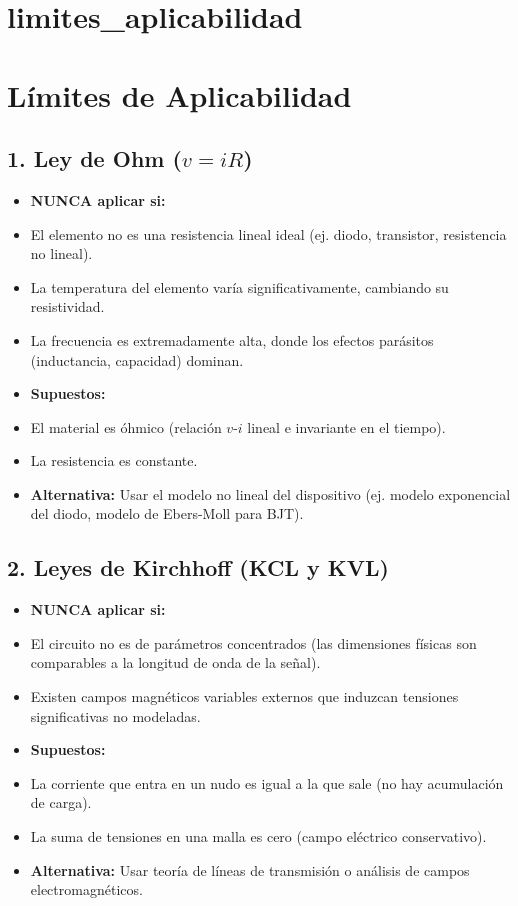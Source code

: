 \documentclass[11pt,a4paper]{article}
\begin{document}
\section*{limites\_aplicabilidad}

\section*{Límites de Aplicabilidad}


\subsection*{1. Ley de Ohm ($v = iR$)}


\begin{itemize}[leftmargin=*,topsep=2pt,itemsep=1pt]
  \item \textbf{NUNCA aplicar si:}
  \item El elemento no es una resistencia lineal ideal (ej. diodo, transistor, resistencia no lineal).
  \item La temperatura del elemento varía significativamente, cambiando su resistividad.
  \item La frecuencia es extremadamente alta, donde los efectos parásitos (inductancia, capacidad) dominan.
  \item \textbf{Supuestos:}
  \item El material es óhmico (relación $v$-$i$ lineal e invariante en el tiempo).
  \item La resistencia es constante.
  \item \textbf{Alternativa:} Usar el modelo no lineal del dispositivo (ej. modelo exponencial del diodo, modelo de Ebers-Moll para BJT).
\end{itemize}


\subsection*{2. Leyes de Kirchhoff (KCL y KVL)}


\begin{itemize}[leftmargin=*,topsep=2pt,itemsep=1pt]
  \item \textbf{NUNCA aplicar si:}
  \item El circuito no es de parámetros concentrados (las dimensiones físicas son comparables a la longitud de onda de la señal).
  \item Existen campos magnéticos variables externos que induzcan tensiones significativas no modeladas.
  \item \textbf{Supuestos:}
  \item La corriente que entra en un nudo es igual a la que sale (no hay acumulación de carga).
  \item La suma de tensiones en una malla es cero (campo eléctrico conservativo).
  \item \textbf{Alternativa:} Usar teoría de líneas de transmisión o análisis de campos electromagnéticos.
\end{itemize}
\end{document}
